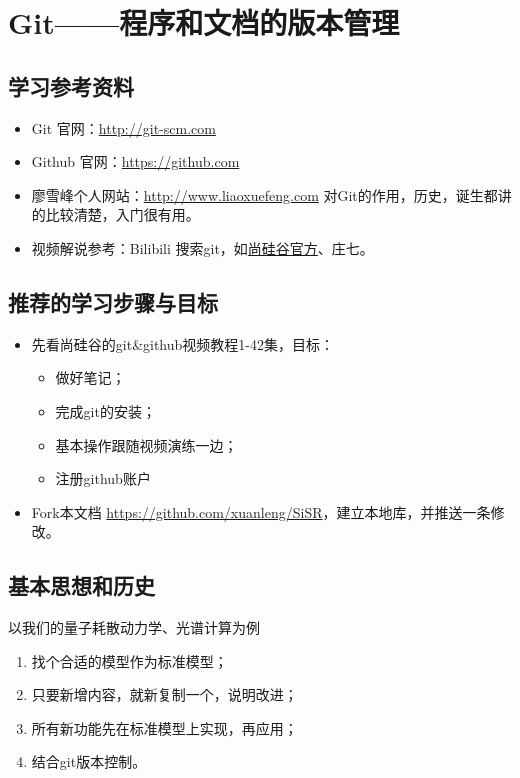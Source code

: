 \chapter{Git——程序和文档的版本管理}
\section{学习参考资料}
\begin{itemize}
\item Git 官网：\url{http://git-scm.com}

\item Github 官网：\url{https://github.com}

\item 廖雪峰个人网站：\url{http://www.liaoxuefeng.com} 对Git的作用，历史，诞生都讲的比较清楚，入门很有用。

\item 视频解说参考：Bilibili 搜索git，如\href{https://www.bilibili.com/video/BV1pW411A7a5?from=search&seid=3815767452396308043}{尚硅谷官方}、庄七。
\end{itemize}


\section{推荐的学习步骤与目标}
\begin{itemize}
\item 先看尚硅谷的git\&github视频教程1-42集，目标：
	\begin{itemize}
	\item 做好笔记；
	\item 完成git的安装；
	\item 基本操作跟随视频演练一边；
	\item 注册github账户
 	\end{itemize}
\item Fork本文档 \url{https://github.com/xuanleng/SiSR}，建立本地库，并推送一条修改。
\end{itemize}


\section{基本思想和历史}
以我们的量子耗散动力学、光谱计算为例
\begin{enumerate}
\item 找个合适的模型作为标准模型；
\item 只要新增内容，就新复制一个，说明改进；
\item 所有新功能先在标准模型上实现，再应用；
\item 结合git版本控制。
\end{enumerate}


